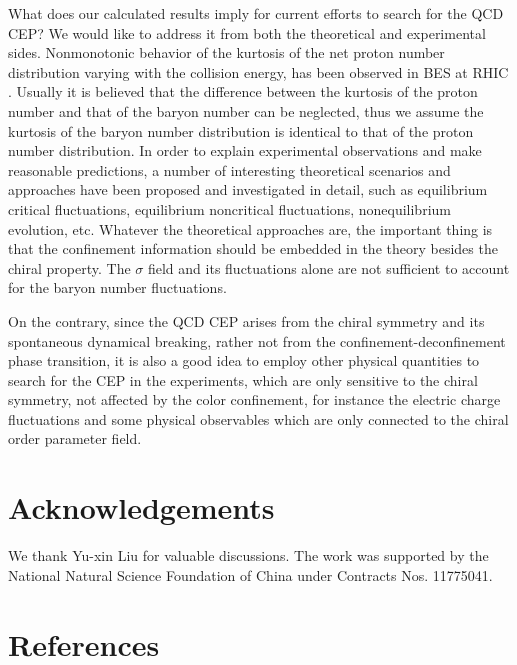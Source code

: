 \documentclass[final,5p,times,twocolumn,colorlinks=true,citecolor=blue,linkcolor=blue]{elsarticle}
\begin{document}
What does our calculated results imply for current efforts to search for the QCD CEP? We would like to address it from both the theoretical and experimental sides. Nonmonotonic behavior of the kurtosis of the net proton number distribution varying with the collision energy, has been observed in BES at RHIC \cite{Luo:2017faz}. Usually it is believed that the difference between the kurtosis of the proton number and that of the baryon number can be neglected, thus we assume the kurtosis of the baryon number distribution is identical to that of the proton number distribution. In order to explain experimental observations and make reasonable predictions, a number of interesting theoretical scenarios and approaches have been proposed and investigated in detail, such as equilibrium critical fluctuations, equilibrium noncritical fluctuations, nonequilibrium evolution, etc. Whatever the theoretical approaches are, the important thing is that the confinement information should be embedded in the theory besides the chiral property. The $\sigma$ field and its fluctuations alone are not sufficient to account for the baryon number fluctuations. 

On the contrary, since the QCD CEP arises from the chiral symmetry and its spontaneous dynamical breaking, rather not from the confinement-deconfinement phase transition, it is also a good idea to employ other physical quantities to search for the CEP in the experiments, which are only sensitive to the chiral symmetry, not affected by the color confinement, for instance the electric charge fluctuations and some physical observables which are only connected to the chiral order parameter field.



\section*{Acknowledgements}
We thank Yu-xin Liu for valuable discussions. The work was supported by the National Natural Science Foundation of China under Contracts Nos. 11775041.
\section*{References}


\end{document}
